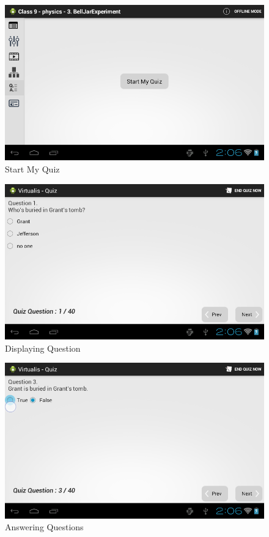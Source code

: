 \documentclass[12pt]{report}
\begin{document}
\begin{figure}[H]
 \centering
 \includegraphics[width=15cm]{./27.png}
 \caption{Start My Quiz \label{fig:27}}
\end{figure}

\begin{figure}[H]
 \centering
 \includegraphics[width=15cm]{./28.png}
 \caption{Displaying Question\label{fig:28}}
\end{figure}

\begin{figure}[H]
 \centering
 \includegraphics[width=15cm]{./29.png}
 \caption{Answering Questions \label{fig:29}}
\end{figure}
\end{document}
